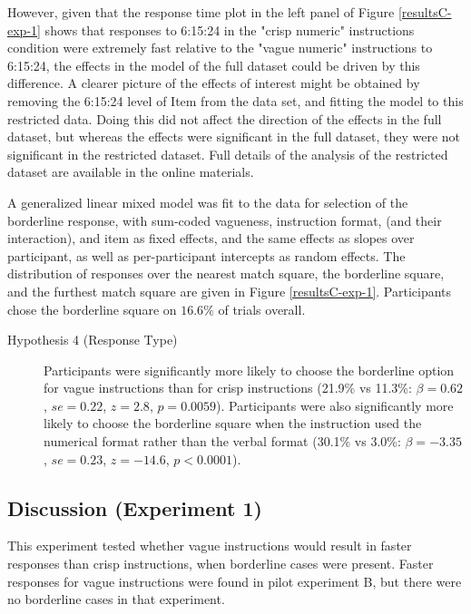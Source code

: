 However, given that the response time plot in the left panel of Figure \ref{resultsC-exp-1} shows that responses to 6:15:24 in the "crisp numeric" instructions condition were extremely fast relative to the "vague numeric" instructions to 6:15:24, the effects in the model of the full dataset could be driven by this difference. A clearer picture of the effects of interest might be obtained by removing the 6:15:24 level of Item from the data set, and fitting the model to this restricted data. Doing this did not affect the direction of the effects in the full dataset, but whereas the effects were significant in the full dataset, they were not significant in the restricted dataset. Full details of the analysis of the restricted dataset are available in the online materials.

A generalized linear mixed model \citet{jaeger2008categorical} was fit to the data for selection of the borderline response, with sum-coded vagueness, instruction format, (and their interaction), and item as fixed effects, and the same effects as slopes over participant, as well as per-participant intercepts as random effects. The distribution of responses over the nearest match square, the borderline square, and the furthest match square are given in Figure \ref{resultsC-exp-1}. Participants chose the borderline square on $16.6\%$ of trials overall.

\begin{description}
\item [Hypothesis 4 (Response Type)] Participants were significantly more likely to choose the borderline option for vague instructions than for crisp instructions (21.9\% vs 11.3\%: $\beta=0.62$, $se=0.22$, $z=2.8$, $p=0.0059$). Participants were also significantly more likely to choose the borderline square when the instruction used the numerical format rather than the verbal format (30.1\% vs 3.0\%: $\beta=-3.35$, $se=0.23$, $z=-14.6$, $p<0.0001$). 
\end{description}

\subsection{Discussion (Experiment 1)}

This experiment tested whether vague instructions would result in faster responses than crisp instructions, when borderline cases were present. Faster responses for vague instructions were found in pilot experiment B, but there were no borderline cases in that experiment.

